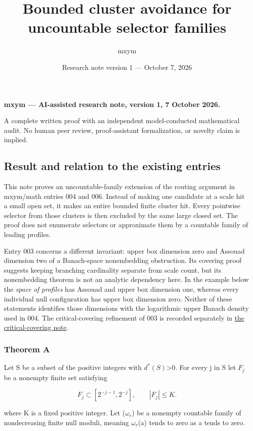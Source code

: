\documentclass[
  11pt,
]{article}
\title{Bounded cluster avoidance for uncountable selector families}
\author{mxym}
\date{Research note version 1 --- October 7, 2026}
\theoremstyle{remark}\newtheorem{remark}[theorem]{Remark}
\begin{document}
\maketitle

\textbf{mxym --- AI-assisted research note, version 1, 7 October 2026.}

A complete written proof with an independent model-conducted
mathematical audit. No human peer review, proof-assistant formalization,
or novelty claim is implied.

\subsection{Result and relation to the existing
entries}\label{result-and-relation-to-the-existing-entries}

This note proves an uncountable-family extension of the routing argument
in mxym/math entries 004 and 006. Instead of making one candidate at a
scale hit a small open set, it makes an entire bounded finite cluster
hit. Every pointwise selector from those clusters is then excluded by
the same large closed set. The proof does not enumerate selectors or
approximate them by a countable family of leading profiles.

Entry 003 concerns a different invariant: upper box dimension zero and
Assouad dimension two of a Banach-space nonembedding obstruction. Its
covering proof suggests keeping branching cardinality separate from
scale count, but its nonembedding theorem is not an analytic dependency
here. In the example below the \emph{space of profiles} has Assouad and
upper box dimension one, whereas every individual null configuration has
upper box dimension zero. Neither of these statements identifies those
dimensions with the logarithmic upper Banach density used in 004. The
critical-covering refinement of 003 is recorded separately in
\href{../critical-covering-gauge/paper.md}{the critical-covering note}.

\subsubsection{Theorem A}\label{theorem-a}

Let S be a subset of the positive integers with \(d^*(S)\)\textgreater0.
For every j in S let \(F_j\) be a nonempty finite set satisfying

\[
F_j\subset[2^{-j-1},2^{-j}],\qquad |F_j|\le K.
\]

where K is a fixed positive integer. Let (\(\omega_r\)) be a nonempty
countable family of nondecreasing finite null moduli, meaning
\(\omega_r\)(a) tends to zero as a tends to zero.
\end{document}
